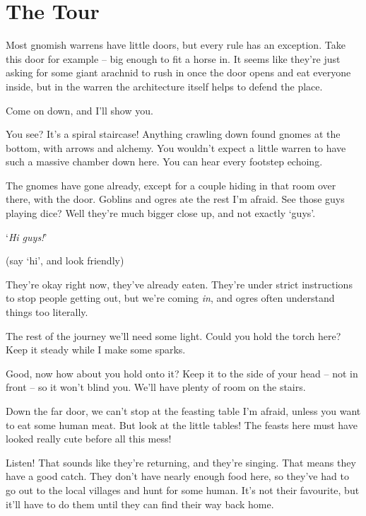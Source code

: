 \chapter{The Tour}

\begin{multicols}{2}
\setcounter{age}{0}

\begin{exampletext}
\noindent
Most gnomish warrens have little doors, but every rule has an exception.
Take this door for example -- big enough to fit a horse in.
It seems like they're just asking for some giant arachnid to rush in once the door opens and eat everyone inside, but in the \gls{warren} the architecture itself helps to defend the place.

Come on down, and I'll show you.

You see?
It's a spiral staircase!
Anything crawling down found gnomes at the bottom, with arrows and alchemy.
You wouldn't expect a little warren to have such a massive chamber down here.
You can hear every footstep echoing.


The gnomes have gone already, except for a couple hiding in that room over there, with the door.
Goblins and ogres ate the rest I'm afraid.
See those guys playing dice?
Well they're much bigger close up, and not exactly `guys'.

`\textit{Hi guys!}'

(say `hi', and look friendly)

They're okay right now, they've already eaten.
They're under strict instructions to stop people getting out, but we're coming \textit{in}, and ogres often understand things too literally.

The rest of the journey we'll need some light.
Could you hold the torch here?
Keep it steady while I make some sparks.

Good, now how about you hold onto it?
Keep it to the side of your head -- not in front -- so it won't blind you.
We'll have plenty of room on the stairs.

Down the far door, we can't stop at the feasting table I'm afraid, unless you want to eat some human meat.
But look at the little tables!
The feasts here must have looked really cute before all this mess!

Listen!
That sounds like they're returning, and they're singing.
That means they have a good catch.
They don't have nearly enough food here, so they've had to go out to the local \glspl{village} and hunt for some human.
It's not their favourite, but it'll have to do them until they can find their way back home.


\end{exampletext}
\end{multicols}
